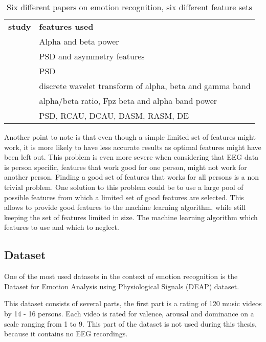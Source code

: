 \begin{table}[]
\centering
\caption{Six different papers on emotion recognition, six different feature sets}
\label{diffFeat}
\begin{tabular}{ll}
\textbf{study} & \textbf{features used}                         \\
\citep{ref4}     & Alpha and beta power                           \\
\citep{ref7}     & PSD and asymmetry features                     \\
\citep{ref8}     & PSD                                            \\
\citep{ref6}     & discrete wavelet transform of alpha, beta and gamma band \\
\citep{ExtendedPaper}	&	alpha/beta ratio, Fpz beta and alpha band power \\
\citep{killyPaper} & PSD, RCAU, DCAU, DASM, RASM, DE \\
\end{tabular}
\end{table}

\npar

Another point to note is that even though a simple limited set of features might work, it is more likely to have less accurate results as optimal features might have been left out. This problem is even more severe when considering that EEG data is person specific\citep{DEAP}, features that work good for one person, might not work for another person. Finding a good set of features that works for all persons is a non trivial problem. One solution to this problem could be to use a large pool of possible features from which a limited set of good features are selected. This allows to provide good features to the machine learning algorithm, while still keeping the set of features limited in size. The machine learning algorithm which features to use and which to neglect.

\subsection{Dataset}
One of the most used datasets in the context of emotion recognition is the Dataset for Emotion Analysis using Physiological Signals (DEAP) dataset\cite{DEAP}.

\npar

This dataset consists of several parts, the first part is a rating of 120 music videos by 14 - 16 persons. Each video is rated for valence, arousal and dominance on a scale ranging from 1 to 9. This part of the dataset is not used during this thesis, because it contains no EEG recordings.


